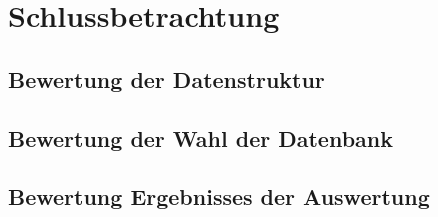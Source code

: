 \section{Schlussbetrachtung}

\subsection{Bewertung der Datenstruktur}

\subsection{Bewertung der Wahl der Datenbank}

\subsection{Bewertung Ergebnisses der Auswertung}

\clearpage